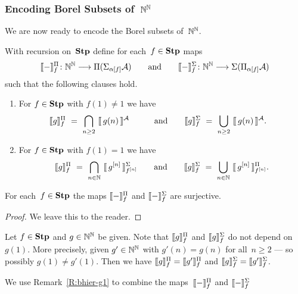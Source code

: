 \subsubsection{Encoding Borel Subsets of~$\mathbb{N}^{\mathbb{N}}$}$\,$\\
We are now ready to encode the Borel subsets of~$\mathbb{N}^{\mathbb{N}}$.
\begin{dfn}
With recursion on~$\mathbf{Stp}$
define for each~$f\in\mathbf{Stp}$
maps
\begin{equation*}
\decode{-}^\Pi_f \colon \N^\N \longrightarrow \Pi(\Sigma_{\alpha[f]}\mathcal{A})
\qquad
\text{and}
\qquad
\decode{-}^\Sigma_f \colon \N^\N 
\longrightarrow \Sigma(\Pi_{\alpha[f]}\mathcal{A})
\end{equation*}
such that the following clauses hold.
\begin{enumerate}
\item
For $f\in \mathbf{Stp}$ with $f(1)\neq 1$ we have
\begin{alignat*}{3}
\decode{g}^\Pi_f \ &=\  
\bigcap_{n\geq 2} \ \decode{\,g(n)\,}^\mathcal{A}&
\qquad\text{and}\qquad
\decode{g}^\Sigma_f \ &=\ 
\bigcup_{n\geq 2}\  \decode{\,g(n)\,}^\mathcal{A}.
\end{alignat*}

\item
For $f\in \mathbf{Stp}$ with $f(1)= 1$
we have
\begin{equation*}
\decode{g}^\Pi_f \ =\ 
\bigcap_{n\in\N}\ \decode{\,g^{[n]}\,}^\Sigma_{f^{[n]}}
\qquad\text{and}\qquad
\decode{g}^\Sigma_f \ =\ 
{\bigcup_{n\in\N}}\ \decode{\,g^{[n]}\,}^\Pi_{f^{[n]}}.
\end{equation*}
\end{enumerate}
\end{dfn}
\begin{lem}
For each~$f\in\mathbf{Stp}$
the maps
$\decode{-}^\Pi_f$
and 
$\decode{-}^\Sigma_f$
are surjective.
\end{lem}
\begin{proof}
We leave this to the reader.
\end{proof}
\begin{rem}
\label{R:bhier-g1}
Let $f\in \mathbf{Stp}$
and $g\in \mathbb{N}^{\mathbb{N}}$ be given.
Note that $\decode{g}^\Pi_f$
and $\decode{g}^\Sigma_f$
do not depend on~$g(1)$.
More precisely,
given $g'\in\mathbb{N}^{\mathbb{N}}$ 
with $g'(n)=g(n)$ for all~$n\geq 2$
--- so  possibly $g(1) \neq g'(1)$.
Then we have  $\decode{g}^\Pi_f = \decode{g'}^\Pi_f$
and $\decode{g}^\Sigma_f = \decode{g'}^\Sigma_f$.
\end{rem}
We use Remark~\ref{R:bhier-g1}
to combine the maps~$\decode{-}^\Pi_f$
and $\decode{-}^\Sigma_f$

